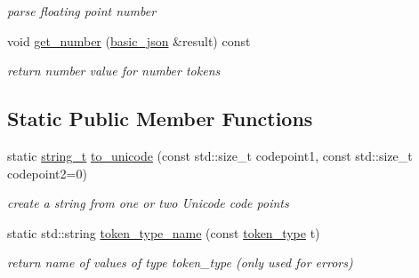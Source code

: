 \begin{DoxyCompactItemize}
$$\begin{DoxyCompactList}\small\item\em parse floating point number \end{DoxyCompactList}\item 
void \hyperlink{classnlohmann_1_1basic__json_1_1lexer_a3a9787fee5177c60bbc80d9e41282e9f}{get\+\_\+number} (\hyperlink{classnlohmann_1_1basic__json}{basic\+\_\+json} \&result) const 
\begin{DoxyCompactList}\small\item\em return number value for number tokens \end{DoxyCompactList}\end{DoxyCompactItemize}
\subsection*{Static Public Member Functions}
\begin{DoxyCompactItemize}
\item 
static \hyperlink{classnlohmann_1_1basic__json_ab63e618bbb0371042b1bec17f5891f42}{string\+\_\+t} \hyperlink{classnlohmann_1_1basic__json_1_1lexer_aaba589becdcea269f271466f73dbf08b}{to\+\_\+unicode} (const std\+::size\+\_\+t codepoint1, const std\+::size\+\_\+t codepoint2=0)
\begin{DoxyCompactList}\small\item\em create a string from one or two Unicode code points \end{DoxyCompactList}\item 
static std\+::string \hyperlink{classnlohmann_1_1basic__json_1_1lexer_ae6c3b669531bc34b7dbd7abe9aa4530d}{token\+\_\+type\+\_\+name} (const \hyperlink{classnlohmann_1_1basic__json_1_1lexer_a96887d6cd131e3d3a85a9d71fbdbcdf7}{token\+\_\+type} t)
\begin{DoxyCompactList}\small\item\em return name of values of type token\+\_\+type (only used for errors) \end{DoxyCompactList}\end{DoxyCompactItemize}
